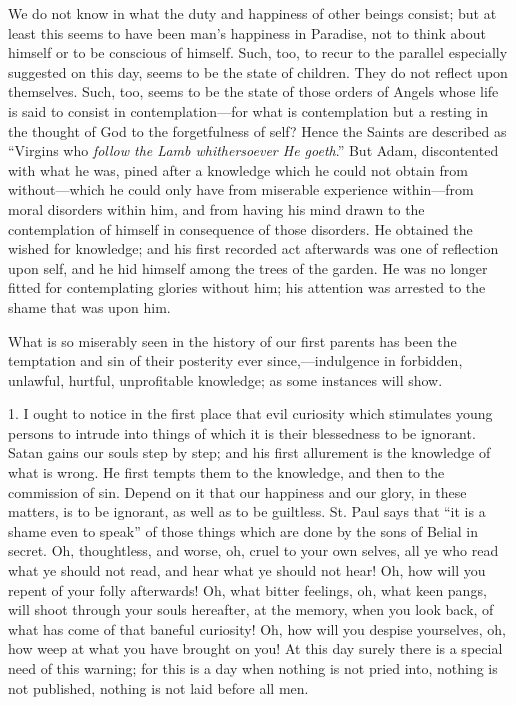 We do not know in what the duty and happiness of other beings
consist; but at least this seems to have been man's happiness in
Paradise, not to think about himself or to be conscious of himself.
Such, too, to recur to the parallel especially suggested on this day,
seems to be the state of children. They do not reflect upon
themselves. Such, too, seems to be the state of those orders of Angels
whose life is said to consist in contemplation—for what is
contemplation but a resting in the thought of God to the forgetfulness
of self? Hence the Saints are described as ``Virgins who \emph{follow
the Lamb whithersoever He goeth}.'' But Adam, discontented with
what he was, pined after a knowledge which he could not obtain from
without—which he could only have from miserable experience within—from
moral disorders within him, and from having his mind drawn to the
contemplation of himself in consequence of those disorders. He
obtained the wished for knowledge; and his first recorded act
afterwards was one of reflection upon self, and he hid himself among
the trees of the garden. He was no longer fitted for contemplating
glories without him; his attention was arrested to the shame that was
upon him.

What is so miserably seen in the history of our first parents has
been the temptation and sin of their posterity ever since,—indulgence
in forbidden, unlawful, hurtful, unprofitable knowledge; as some
instances will show.

1. I ought to notice in the first place that evil curiosity which
stimulates young persons to intrude into things of which it is their
blessedness to be ignorant. Satan gains our souls step by step; and
his first allurement is the knowledge of what is wrong. He first
tempts them to the knowledge, and then to the commission of sin.
Depend on it that our happiness and our glory, in these matters, is to
be ignorant, as well as to be guiltless. St. Paul says that ``it
is a shame even to speak'' of those things which are done by the
sons of Belial in secret. Oh, thoughtless, and worse, oh, cruel to
your own selves, all ye who read what ye should not read, and hear
what ye should not hear! Oh, how will you repent of your folly
afterwards! Oh, what bitter feelings, oh, what keen pangs, will shoot
through your souls hereafter, at the memory, when you look back, of
what has come of that baneful curiosity! Oh, how will you despise
yourselves, oh, how weep at what you have brought on you! At this day
surely there is a special need of this warning; for this is a day when
nothing is not pried into, nothing is not published, nothing is not
laid before all men.

